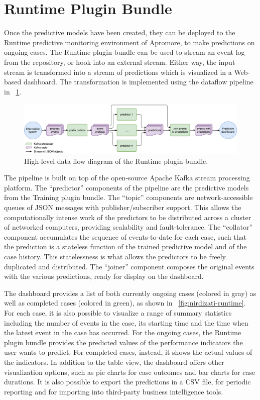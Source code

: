 \documentclass[runningheads,a4paper]{llncs}
\begin{document}
\section{Runtime Plugin Bundle} \label{sec:runtime}
Once the predictive models have been created, they can be deployed to the Runtime predictive monitoring environment of Apromore, to make predictions on ongoing cases. The Runtime plugin bundle can be used to stream an event log from the repository, or hook into an external stream. Either way, the input stream is transformed into a stream of predictions which is visualized in a Web-based dashboard. The transformation is implemented using the dataflow pipeline in \figurename~\ref{fig:dfd_0}.
\vspace{-.5\baselineskip}
\begin{figure}[htp!]
	\centering
	\includegraphics[width=\textwidth]{img/runtime-dataflow}
	\caption{High-level data flow diagram of the Runtime plugin bundle.}
	\label{fig:dfd_0}
\end{figure}
\vspace{-.5\baselineskip}

The pipeline is built on top of the open-source Apache Kafka stream processing platform. The ``predictor'' components of the pipeline are the predictive models from the Training plugin bundle. The ``topic'' components are network-accessible queues of JSON messages with publisher/subscriber support. This allows the computationally intense work of the predictors to be distributed across a cluster of networked computers, providing scalability and fault-tolerance.
The ``collator'' component accumulates the sequence of events-to-date for each case, such that the prediction is a stateless function of the trained predictive model and of the case history.  This statelessness is what allows the predictors to be freely duplicated and distributed.  The ``joiner'' component composes the original events with the various predictions, ready for display on the dashboard.

The dashboard provides a list of both currently ongoing cases (colored in gray) as well as completed cases (colored in green), as shown in \figurename~\ref{fig:nirdizati-runtime}. For each case, it is also possible to visualize a range of summary statistics including the number of events in the case, its starting time and the time when the latest event in the case has occurred. For the ongoing cases, the Runtime plugin bundle provides the predicted values of the performance indicators the user wants to predict. For completed cases, instead, it shows the actual values of the indicators. In addition to the table view, the dashboard offers other visualization options, such as pie charts for case outcomes and bar charts for case durations. It is also possible to export the predictions in a CSV file, for periodic reporting and for importing into third-party business intelligence tools.
\end{document}
